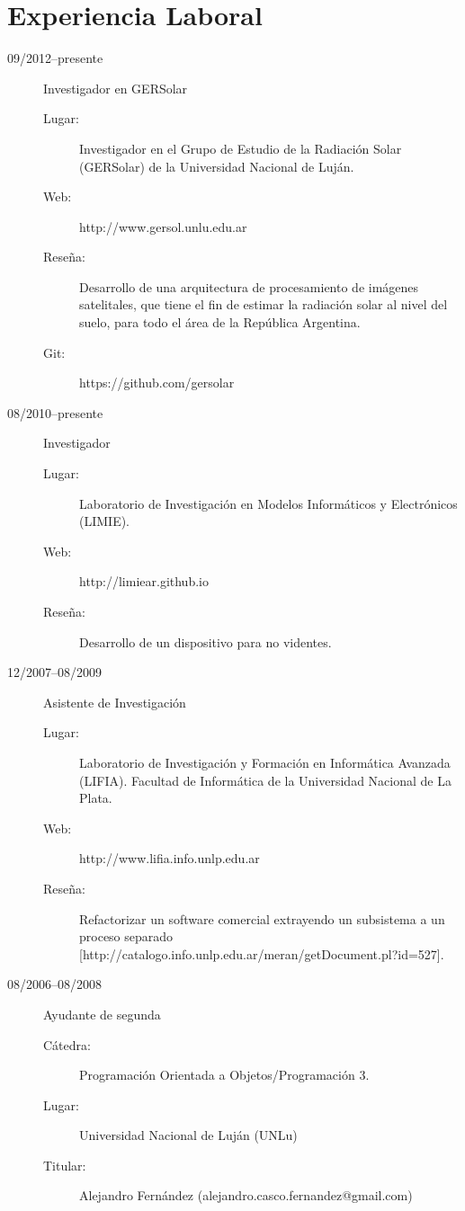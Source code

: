 \documentclass[a4paper]{article}
\begin{document}
\section{Experiencia Laboral}
\begin{description}
\item[09/2012--presente] Investigador en GERSolar
	\begin{description}
	\item[Lugar: ] Investigador en el Grupo de Estudio de la Radiación Solar (GERSolar) de la Universidad Nacional de Luján.
	\item[Web: ] http://www.gersol.unlu.edu.ar
	\item[Reseña: ]  Desarrollo de una arquitectura de procesamiento de imágenes satelitales, que tiene el fin  de estimar la radiación solar al nivel del suelo, para todo el área de la República Argentina.
	\item[Git: ] https://github.com/gersolar
	\end{description}
\item[08/2010--presente] Investigador
	\begin{description}
	\item[Lugar: ] Laboratorio de Investigación en Modelos Informáticos y Electrónicos (LIMIE).
	\item[Web: ] http://limiear.github.io
	\item[Reseña: ] Desarrollo de un dispositivo para no videntes.
	\end{description}
\item[12/2007--08/2009] Asistente de Investigación
	\begin{description}
	\item[Lugar: ] Laboratorio de Investigación y Formación en Informática Avanzada (LIFIA). Facultad de Informática de la Universidad Nacional de La Plata.
	\item[Web: ] http://www.lifia.info.unlp.edu.ar
	\item[Reseña: ] Refactorizar un software comercial extrayendo un subsistema a un proceso separado [http://catalogo.info.unlp.edu.ar/meran/getDocument.pl?id=527].
	\end{description}
\item[08/2006--08/2008] Ayudante de segunda
	\begin{description}
	\item[Cátedra: ] Programación Orientada a Objetos/Programación 3.
	\item[Lugar: ] Universidad Nacional de Luján (UNLu)
	\item[Titular: ] Alejandro Fernández (alejandro.casco.fernandez@gmail.com)

\end{description}
\end{description}
\end{document}
